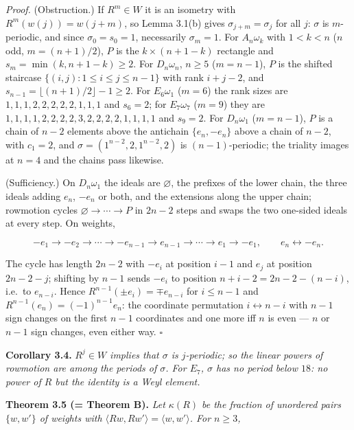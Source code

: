 \documentclass[
]{article}
\begin{document}
\emph{Proof.} (Obstruction.) If \(R^m \in W\) it is an isometry with
\(R^m(w(j)) = w(j+m)\), so Lemma 3.1(b) gives
\(\sigma_{j+m} = \sigma_j\) for all \(j\): \(\sigma\) is \(m\)-periodic,
and since \(\sigma_0 = s_0 = 1\), necessarily \(\sigma_m = 1\). For
\(A_n\omega_k\) with \(1 < k < n\) (\(n\) odd, \(m = (n+1)/2\)), \(P\)
is the \(k \times (n+1-k)\) rectangle and
\(s_m = \min(k, n+1-k) \ge 2\). For \(D_n\omega_n\), \(n \ge 5\)
(\(m = n-1\)), \(P\) is the shifted staircase
\(\{(i,j) : 1 \le i \le j \le n-1\}\) with rank \(i+j-2\), and
\(s_{n-1} = \lfloor (n+1)/2 \rfloor - 1 \ge 2\). For \(E_6\omega_1\)
(\(m = 6\)) the rank sizes are \(1,1,1,2,2,2,2,2,1,1,1\) and
\(s_6 = 2\); for \(E_7\omega_7\) (\(m = 9\)) they are
\(1,1,1,1,2,2,2,2,3,2,2,2,2,1,1,1,1\) and \(s_9 = 2\). For
\(D_n\omega_1\) (\(m = n-1\)), \(P\) is a chain of \(n-2\) elements
above the antichain \(\{e_n, -e_n\}\) above a chain of \(n-2\), with
\(c_1 = 2\), and \(\sigma = (1^{n-2}, 2, 1^{n-2}, 2)\) is
\((n-1)\)-periodic; the triality images at \(n = 4\) and the chains pass
likewise.

(Sufficiency.) On \(D_n\omega_1\) the ideals are \(\varnothing\), the
prefixes of the lower chain, the three ideals adding \(e_n\), \(-e_n\)
or both, and the extensions along the upper chain; rowmotion cycles
\(\varnothing \to \cdots \to P\) in \(2n-2\) steps and swaps the two
one-sided ideals at every step. On weights,

\[-e_1 \to -e_2 \to \cdots \to -e_{n-1} \to e_{n-1} \to \cdots \to e_1 \to -e_1, \qquad e_n \leftrightarrow -e_n .\]

The cycle has length \(2n-2\) with \(-e_i\) at position \(i-1\) and
\(e_j\) at position \(2n-2-j\); shifting by \(n-1\) sends \(-e_i\) to
position \(n+i-2 = 2n-2-(n-i)\), i.e.~to \(e_{n-i}\). Hence
\(R^{n-1}(\pm e_i) = \mp e_{n-i}\) for \(i \le n-1\) and
\(R^{n-1}(e_n) = (-1)^{n-1}e_n\): the coordinate permutation
\(i \leftrightarrow n-i\) with \(n-1\) sign changes on the first \(n-1\)
coordinates and one more iff \(n\) is even --- \(n\) or \(n-1\) sign
changes, even either way. \(\square\)

\textbf{Corollary 3.4.} \emph{\(R^j \in W\) implies that \(\sigma\) is
\(j\)-periodic; so the linear powers of rowmotion are among the periods
of \(\sigma\). For \(E_7\), \(\sigma\) has no period below \(18\): no
power of \(R\) but the identity is a Weyl element.}

\textbf{Theorem 3.5 (= Theorem B).} \emph{Let \(\kappa(R)\) be the
fraction of unordered pairs \(\{w,w'\}\) of weights with
\(\langle Rw, Rw' \rangle = \langle w, w' \rangle\). For \(n \ge 3\),}
\end{document}
